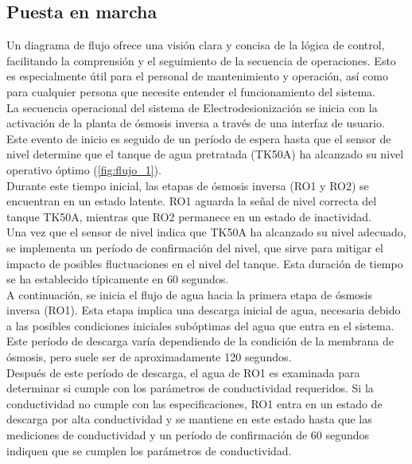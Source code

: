 \subsection{Puesta en marcha}

Un diagrama de flujo ofrece una visión clara y concisa de la lógica de control,
facilitando la comprensión y el seguimiento de la secuencia de operaciones.
Esto es especialmente útil para el personal de mantenimiento y operación,
así como para cualquier persona que necesite entender el funcionamiento del sistema.\\

La secuencia operacional del sistema de Electrodesionización se inicia con la activación de la planta de
ósmosis inversa a través de una interfaz de usuario. Este evento de inicio es seguido de un
período de espera hasta que el sensor de nivel determine que el tanque de agua pretratada (TK50A)
ha alcanzado su nivel operativo óptimo (\ref{fig:flujo_1}).\\

Durante este tiempo inicial, las etapas de ósmosis inversa (RO1 y RO2) se encuentran en un estado
latente. RO1 aguarda la señal de nivel correcta del tanque TK50A, mientras que RO2 permanece en un
estado de inactividad.\\

Una vez que el sensor de nivel indica que TK50A ha alcanzado su nivel adecuado, se implementa
un período de confirmación del nivel, que sirve para mitigar el impacto de posibles fluctuaciones
en el nivel del tanque. Esta duración de tiempo se ha establecido típicamente en 60 segundos.\\

A continuación, se inicia el flujo de agua hacia la primera etapa de ósmosis inversa (RO1). Esta
etapa implica una descarga inicial de agua, necesaria debido a las posibles condiciones iniciales
subóptimas del agua que entra en el sistema. Este período de descarga varía dependiendo de la condición
de la membrana de ósmosis, pero suele ser de aproximadamente 120 segundos.\\

Después de este período de descarga, el agua de RO1 es examinada para determinar si cumple con los
parámetros de conductividad requeridos. Si la conductividad no cumple con las especificaciones, RO1
entra en un estado de descarga por alta conductividad y se mantiene en este estado hasta que las
mediciones de conductividad y un período de confirmación de 60 segundos indiquen que se cumplen
los parámetros de conductividad.\\

